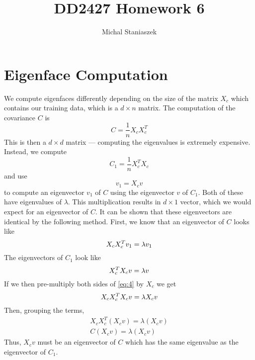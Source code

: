 \documentclass[10pt,a4paper]{article}
\author{Michal Staniaszek}
\title{DD2427 Homework 6}
\begin{document}
\maketitle

\section{Eigenface Computation}
We compute eigenfaces differently depending on the size of the matrix $X_c$ which
contains our training data, which is a $d\times n$ matrix. The computation of
the covariance $C$ is 
\begin{equation}
  \label{eq:1}
  C=\frac{1}{n}X_cX_c^T
\end{equation}
This is then a $d\times d$ matrix --- computing the eigenvalues is extremely
expensive. Instead, we compute
\begin{equation}
  \label{eq:2}
  C_1=\frac{1}{n}X_c^TX_c
\end{equation}
and use 
\begin{equation}
  \label{eq:3}
  v_1=X_cv
\end{equation}
to compute an eigenvector $v_1$ of $C$ using the eigenvector $v$ of $C_1$. Both
of these have eigenvalues of $\lambda$. This multiplication results in $d\times
1$ vector, which we would expect for an eigenvector of $C$. It can be shown that
these eigenvectors are identical by the following method. First, we know that an
eigenvector of $C$ looks like
\begin{equation}
  X_cX_c^Tv_1=\lambda v_1\\
\end{equation}
The eigenvectors of $C_1$ look like
\begin{equation}
  \label{eq:4}
  X_c^TX_cv=\lambda v\\
\end{equation}
If we then pre-multiply both sides of \eqref{eq:4} by $X_c$ we get
\begin{equation}
  \label{eq:5}
  X_cX_c^TX_cv=\lambda X_cv\\
\end{equation}
Then, grouping the terms,
\begin{align}
  \label{eq:5}
  X_cX_c^T\left(X_cv\right)=\lambda \left(X_cv\right)\\
  C\left(X_cv\right)=\lambda \left(X_cv\right)
\end{align}
Thus, $X_cv$ must be an eigenvector of $C$ which has the same eigenvalue as the
eigenvector of $C_1$.
  
\end{document}
